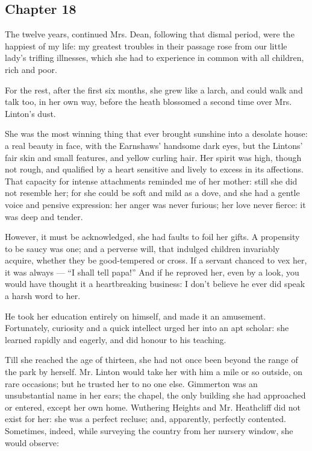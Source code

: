 \subsection*{Chapter 18}

\par The twelve years, continued Mrs. Dean, following that dismal period, were the happiest of my life: my greatest troubles in their passage rose from our little lady's trifling illnesses, which she had to experience in common with all children, rich and poor.
\par For the rest, after the first six months, she grew like a larch, and could walk and talk too, in her own way, before the heath blossomed a second time over Mrs. Linton's dust.
\par She was the most winning thing that ever brought sunshine into a desolate house: a real beauty in face, with the Earnshaws' handsome dark eyes, but the Lintons' fair skin and small features, and yellow curling hair. Her spirit was high, though not rough, and qualified by a heart sensitive and lively to excess in its affections. That capacity for intense attachments reminded me of her mother: still she did not resemble her; for she could be soft and mild as a dove, and she had a gentle voice and pensive expression: her anger was never furious; her love never fierce: it was deep and tender.
\par However, it must be acknowledged, she had faults to foil her gifts. A propensity to be saucy was one; and a perverse will, that indulged children invariably acquire, whether they be good-tempered or cross. If a servant chanced to vex her, it was always — “I shall tell papa!” And if he reproved her, even by a look, you would have thought it a heartbreaking business: I don't believe he ever did speak a harsh word to her.
\par He took her education entirely on himself, and made it an amusement. Fortunately, curiosity and a quick intellect urged her into an apt scholar: she learned rapidly and eagerly, and did honour to his teaching.
\par Till she reached the age of thirteen, she had not once been beyond the range of the park by herself. Mr. Linton would take her with him a mile or so outside, on rare occasions; but he trusted her to no one else. Gimmerton was an unsubstantial name in her ears; the chapel, the only building she had approached or entered, except her own home. Wuthering Heights and Mr. Heathcliff did not exist for her: she was a perfect recluse; and, apparently, perfectly contented. Sometimes, indeed, while surveying the country from her nursery window, she would observe:
